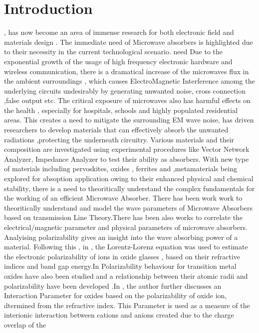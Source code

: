 \documentclass[journal]{IEEEtran}
\begin{document}
\section{Introduction}
% 
% 
% 
% 
 , has now become an area of  immense research for both electronic field and materials design . The immediate need of Microwave absorbers is highlighted due to their necessity in the current technological scenario. need Due to the exponential growth of the usage of high frequency  electronic hardware and wireless communication, there is a dramatical increase of the microwaves flux in the ambient surroundings , which causes ElectroMagnetic Interference amomg the underlying circuits undesirably by generating unwanted noise, cross connection ,false output etc\cite{Shukla}. The critical exposure of microwaves  also has harmful effects on the health , especially for hospitals, schools and highly populated residential areas. This creates a  need to mitigate the surrounding EM wave  noise, has driven researchers to develop materials that can effectively absorb the unwanted radiations ,protecting the underneath circuitry\cite{r14}. Various materials and their composition are investigated using experimental procedures like Vector Network Analyzer, Impedance Analyzer to test their ability as absorbers. With new type of materials including pervoskites, oxides , ferrites and ,metamaterials being explored for absoption application owing to their enhanced physical and chemical stability, there is a need to theoritically understand the complex fundamentals for the working of an efficient Microwave Absorber. There  has been work  work to theoritically understand and model the wave parameters of Microwave Absorbers\cite{YingL2,YingL} based on transmission Line Theory.There has been also works to correlate the electrical/magnetic parameter and physical parameters of microwave absorbers. Analyising polarizability gives an insight into the wave absorbing power of a material. Following this , in \cite{Erbium} , the Lorentz-Lorenz equation was used to estimate  the electronic polarizability of ions in oxide glasses , based on their refractive indices and band gap energy.In \cite{JaiS} Polarizability behaviour for transition metal oxides have also been studied and a relationship between their atomic radii and polarizability have been developed .In \cite{dimitrov1999effect,dimitrov1999electronic} , the author further discusses an Interaction Parameter for oxides based  on the polarizability of oxide ion, dtermined from the refractive index. This Parameter is used as a measure of the interionic interaction between cations and anions created due to the charge overlap of the 
\end{document}

